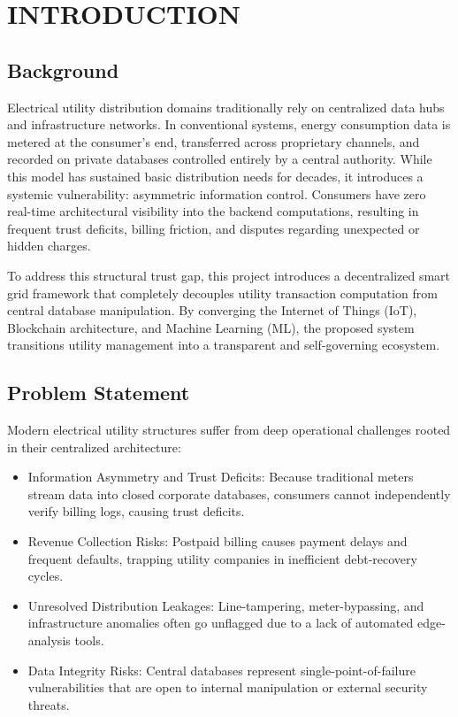 
\chapter{INTRODUCTION}

\section{Background}

Electrical utility distribution domains traditionally rely on centralized data hubs and infrastructure networks. In conventional systems, energy consumption data is metered at the consumer's end, transferred across proprietary channels, and recorded on private databases controlled entirely by a central authority. While this model has sustained basic distribution needs for decades, it introduces a systemic vulnerability: asymmetric information control. Consumers have zero real-time architectural visibility into the backend computations, resulting in frequent trust deficits, billing friction, and disputes regarding unexpected or hidden charges.

To address this structural trust gap, this project introduces a decentralized smart grid framework that completely decouples utility transaction computation from central database manipulation. By converging the Internet of Things (IoT), Blockchain architecture, and Machine Learning (ML), the proposed system transitions utility management into a transparent and self-governing ecosystem.

\section{Problem Statement}

Modern electrical utility structures suffer from deep operational challenges rooted in their centralized architecture:

\begin{itemize}
\item Information Asymmetry and Trust Deficits: Because traditional meters stream data into closed corporate databases, consumers cannot independently verify billing logs, causing trust deficits.

\item Revenue Collection Risks: Postpaid billing causes payment delays and frequent defaults, trapping utility companies in inefficient debt-recovery cycles.

\item Unresolved Distribution Leakages: Line-tampering, meter-bypassing, and infrastructure anomalies often go unflagged due to a lack of automated edge-analysis tools.

\item Data Integrity Risks: Central databases represent single-point-of-failure vulnerabilities that are open to internal manipulation or external security threats.
\end{itemize}


